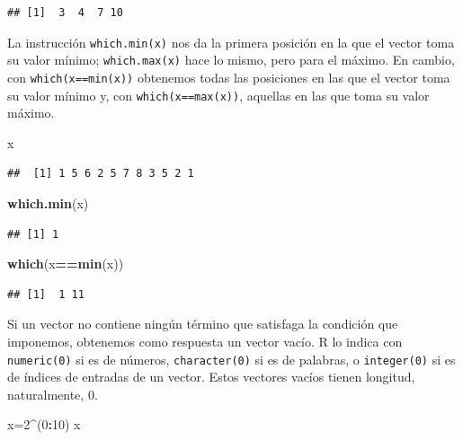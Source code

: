 \documentclass[]{book}
\newenvironment{Shaded}{\begin{snugshade}}{\end{snugshade}}
\newcommand{\DecValTok}[1]{\textcolor[rgb]{0.00,0.00,0.81}{#1}}
\newcommand{\KeywordTok}[1]{\textcolor[rgb]{0.13,0.29,0.53}{\textbf{#1}}}
\newcommand{\NormalTok}[1]{#1}
\newcommand{\OperatorTok}[1]{\textcolor[rgb]{0.81,0.36,0.00}{\textbf{#1}}}
\theoremstyle{definition}
\theoremstyle{definition}
\theoremstyle{definition}
\theoremstyle{remark}
\begin{document}
\begin{verbatim}
## [1]  3  4  7 10
\end{verbatim}

La instrucción \texttt{which.min(x)} nos da la primera posición en la que el vector toma su valor mínimo; \texttt{which.max(x)} hace lo mismo, pero para el máximo. En cambio, con
\texttt{which(x==min(x))} obtenemos todas las posiciones en las que el vector toma su valor mínimo y, con \texttt{which(x==max(x))}, aquellas en las que toma su valor máximo.

\begin{Shaded}
\begin{Highlighting}[]
\NormalTok{x}
\end{Highlighting}
\end{Shaded}

\begin{verbatim}
##  [1] 1 5 6 2 5 7 8 3 5 2 1
\end{verbatim}

\begin{Shaded}
\begin{Highlighting}[]
\KeywordTok{which.min}\NormalTok{(x)}
\end{Highlighting}
\end{Shaded}

\begin{verbatim}
## [1] 1
\end{verbatim}

\begin{Shaded}
\begin{Highlighting}[]
\KeywordTok{which}\NormalTok{(x}\OperatorTok{==}\KeywordTok{min}\NormalTok{(x))}
\end{Highlighting}
\end{Shaded}

\begin{verbatim}
## [1]  1 11
\end{verbatim}

Si un vector no contiene ningún término que satisfaga la condición que imponemos, obtenemos como respuesta un vector vacío. R lo indica con \texttt{numeric(0)} si es de números, \texttt{character(0)} si es de palabras, o \texttt{integer(0)} si es de índices de entradas de un vector. Estos vectores vacíos tienen longitud, naturalmente, 0.

\begin{Shaded}
\begin{Highlighting}[]
\NormalTok{x=}\DecValTok{2}\OperatorTok{^}\NormalTok{(}\DecValTok{0}\OperatorTok{:}\DecValTok{10}\NormalTok{)}
\NormalTok{x}
\end{Highlighting}
\end{Shaded}
\end{document}
